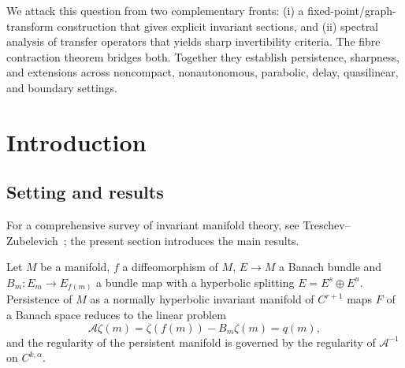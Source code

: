 \documentclass[11pt,a4paper]{article}
\theoremstyle{plain}
\theoremstyle{definition}
\theoremstyle{remark}
\numberwithin{equation}{section}
\numberwithin{figure}{section}
\begin{document}
We attack this question from two complementary fronts: (i) a fixed-point/graph-transform construction that gives explicit invariant sections, and (ii) spectral analysis of transfer operators that yields sharp invertibility criteria. The fibre contraction theorem bridges both. Together they establish persistence, sharpness, and extensions across noncompact, nonautonomous, parabolic, delay, quasilinear, and boundary settings.

\section{Introduction}

\subsection{Setting and results}

For a comprehensive survey of invariant manifold theory, see Treschev–Zubelevich~\cite{tre2010}; the present section introduces the main results.

Let $M$ be a manifold, $f$ a diffeomorphism of $M$, $E\to M$ a Banach bundle and $B_m:E_m\to E_{f(m)}$ a bundle map with a hyperbolic splitting $E=E^s\oplus E^u$. Persistence of $M$ as a normally hyperbolic invariant manifold of $C^{r+1}$ maps $F$ of a Banach space reduces to the linear problem
\[
\mathcal A\zeta(m)=\zeta(f(m))-B_m\zeta(m)=q(m),
\]
and the regularity of the persistent manifold is governed by the regularity of $\mathcal A^{-1}$ on $C^{k,\alpha}$.
\end{document}
